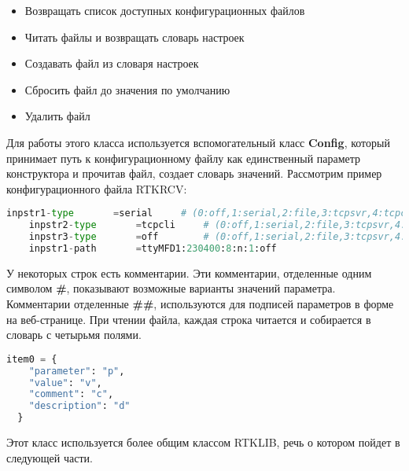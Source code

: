 \begin{itemize}
  \item Возвращать список доступных конфигурационных файлов
  \item Читать файлы и возвращать словарь настроек
  \item Создавать файл из словаря настроек
  \item Сбросить файл до значения по умолчанию
  \item Удалить файл
\end{itemize}

Для работы этого класса используется вспомогательный класс \textbf{Config}, который принимает путь к конфигурационному файлу как единственный параметр конструктора и прочитав файл, создает словарь значений. Рассмотрим пример конфигурационного файла RTKRCV:

\begin{ListingEnv}[H]
  \caption{Отрывок конфигурационного файла RTKRCV}
  \label{list:hwbeauty}
  \begin{lstlisting}[language=Python]
    inpstr1-type       =serial     # (0:off,1:serial,2:file,3:tcpsvr,4:tcpcli,7:ntripcli,8:ftp,9:http) ## Input source for onboard receiver
    inpstr2-type       =tcpcli     # (0:off,1:serial,2:file,3:tcpsvr,4:tcpcli,7:ntripcli,8:ftp,9:http) ## Input source for base corrections
    inpstr3-type       =off        # (0:off,1:serial,2:file,3:tcpsvr,4:tcpcli,7:ntripcli,8:ftp,9:http)
    inpstr1-path       =ttyMFD1:230400:8:n:1:off
  \end{lstlisting}
\end{ListingEnv}

У некоторых строк есть комментарии. Эти комментарии, отделенные одним символом \textbf{\#}, показывают возможные варианты значений параметра. Комментарии отделенные \textbf{\#\#}, используются для подписей параметров в форме на веб-странице. При чтении файла, каждая строка читается и собирается в словарь с четырьмя полями.

\begin{ListingEnv}[H]
  \caption{Представление параметра конфигурационного файла в памяти}
  \label{list:hwbeauty}
  \begin{lstlisting}[language=Python]
  item0 = {
    "parameter": "p",
    "value": "v",
    "comment": "c",
    "description": "d"
  }
  \end{lstlisting}
\end{ListingEnv}

Этот класс используется более общим классом RTKLIB, речь о котором пойдет в следующей части.


